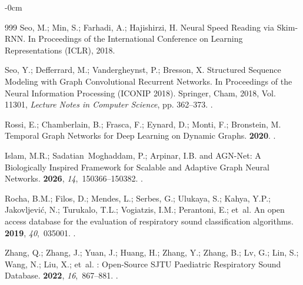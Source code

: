 \documentclass[algorithms,article,submit,pdftex,oneauthor]{Definitions/mdpi}
\begin{document}
\begin{adjustwidth}{-\extralength}{0cm}
\begin{thebibliography}{999}
Seo, M.; Min, S.; Farhadi, A.; Hajishirzi, H.
\newblock Neural Speed Reading via {Skim-RNN}.
\newblock In Proceedings of the International Conference on Learning
  Representations (ICLR),  2018.

Seo, Y.; Defferrard, M.; Vandergheynst, P.; Bresson, X.
\newblock Structured Sequence Modeling with Graph Convolutional Recurrent
  Networks.
\newblock In Proceedings of the Neural Information Processing (ICONIP 2018).
  Springer, Cham,  2018, Vol. 11301, {\em Lecture Notes in Computer Science},
  pp. 362--373.
.

Rossi, E.; Chamberlain, B.; Frasca, F.; Eynard, D.; Monti, F.; Bronstein, M.
\newblock Temporal Graph Networks for Deep Learning on Dynamic Graphs.
 {\bf 2020}.
.

Islam, M.R.; Sadatian~Moghaddam, P.; Arpinar, I.B.
 and {AGN-Net}: A Biologically Inspired Framework for
  Scalable and Adaptive Graph Neural Networks.
 {\bf 2026}, {\em 14},~150366--150382.
.

Rocha, B.M.; Filos, D.; Mendes, L.; Serbes, G.; Ulukaya, S.; Kahya, Y.P.;
  Jakovljevi{\'c}, N.; Turukalo, T.L.; Vogiatzis, I.M.; Perantoni, E.;  et~al.
\newblock An open access database for the evaluation of respiratory sound
  classification algorithms.
 {\bf 2019}, {\em 40},~035001.
.

Zhang, Q.; Zhang, J.; Yuan, J.; Huang, H.; Zhang, Y.; Zhang, B.; Lv, G.; Lin,
  S.; Wang, N.; Liu, X.;  et~al.
: Open-Source {SJTU} Paediatric Respiratory Sound Database.
 {\bf
  2022}, {\em 16},~867--881.
.


\end{thebibliography}
\end{adjustwidth}
\end{document}
